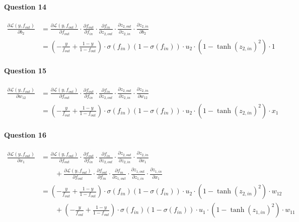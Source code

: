 \documentclass[
  a4paper,
]{article}
\begin{document}
\hypertarget{question-14}{%
\paragraph{Question 14}\label{question-14}}

\begin{align*}
\frac{\partial\mathcal{L}(y,  f_{out})}{\partial b_2}
&=\frac{\partial\mathcal{L}(y,  f_{out})}{\partial f_{out}}
\cdot\frac{\partial f_{out}}{\partial f_{in}}
\cdot\frac{\partial f_{in}}{\partial z_{2,out}}
\cdot\frac{\partial z_{2,out}}{\partial z_{2,in}}
\cdot\frac{\partial z_{2,in}}{\partial b_2} \\
&=\left(-\frac{y}{ f_{out}}+\frac{1-y}{1- f_{out}}\right)
\cdot\sigma(f_{in})(1-\sigma(f_{in}))
\cdot u_2
\cdot(1-\tanh(z_{2,in})^2)
\cdot 1
\end{align*}

\hypertarget{question-15}{%
\paragraph{Question 15}\label{question-15}}

\begin{align*}
\frac{\partial\mathcal{L}(y,  f_{out})}{\partial w_{12}}
&=\frac{\partial\mathcal{L}(y,  f_{out})}{\partial f_{out}}
\cdot\frac{\partial f_{out}}{\partial f_{in}}
\cdot\frac{\partial f_{in}}{\partial z_{2,out}}
\cdot\frac{\partial z_{2,out}}{\partial z_{2,in}}
\cdot\frac{\partial z_{2,in}}{\partial w_{12}} \\
&=\left(-\frac{y}{ f_{out}}+\frac{1-y}{1- f_{out}}\right)
\cdot\sigma(f_{in})(1-\sigma(f_{in}))
\cdot u_2
\cdot(1-\tanh(z_{2,in})^2)
\cdot x_1
\end{align*}

\hypertarget{question-16}{%
\paragraph{Question 16}\label{question-16}}

\begin{align*}
\frac{\partial\mathcal{L}(y,  f_{out})}{\partial x_1}
&=\frac{\partial\mathcal{L}(y,  f_{out})}{\partial f_{out}}
\cdot\frac{\partial f_{out}}{\partial f_{in}}
\cdot\frac{\partial f_{in}}{\partial z_{2,out}}
\cdot\frac{\partial z_{2,out}}{\partial z_{2,in}}
\cdot\frac{\partial z_{2,in}}{\partial x_{1}} \\
&\quad\quad + \frac{\partial\mathcal{L}(y,  f_{out})}{\partial f_{out}}
\cdot\frac{\partial f_{out}}{\partial f_{in}}
\cdot\frac{\partial f_{in}}{\partial z_{1,out}}
\cdot\frac{\partial z_{1,out}}{\partial z_{1,in}}
\cdot\frac{\partial z_{1,in}}{\partial x_{1}} \\
&=\left(-\frac{y}{ f_{out}}+\frac{1-y}{1- f_{out}}\right)
\cdot\sigma(f_{in})(1-\sigma(f_{in}))
\cdot u_2
\cdot(1-\tanh(z_{2,in})^2)
\cdot w_{12} \\
&\quad\quad+\left(-\frac{y}{ f_{out}}+\frac{1-y}{1- f_{out}}\right)
\cdot\sigma(f_{in})(1-\sigma(f_{in}))
\cdot u_1
\cdot(1-\tanh(z_{1,in})^2)
\cdot w_{11}
\end{align*}
\end{document}
